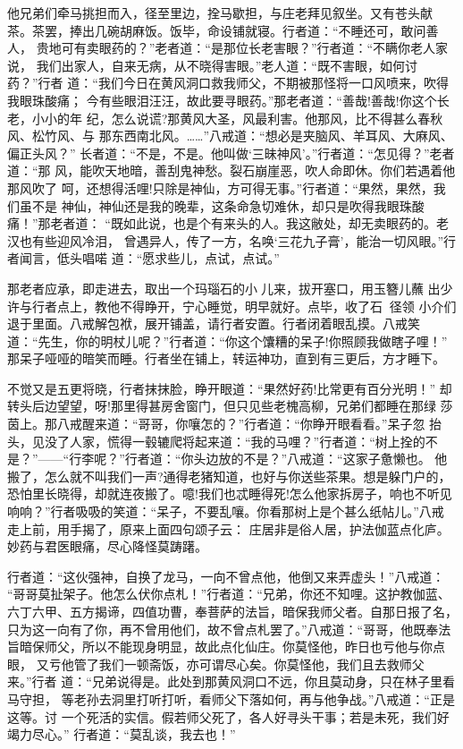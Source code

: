 他兄弟们牵马挑担而入，径至里边，拴马歇担，与庄老拜见叙坐。又有苍头献
茶。茶罢，捧出几碗胡麻饭。饭毕，命设铺就寝。行者道：“不睡还可，敢问善人，
贵地可有卖眼药的？”老者道：“是那位长老害眼？”行者道：“不瞒你老人家说，
我们出家人，自来无病，从不晓得害眼。”老人道：“既不害眼，如何讨药？”行者
道：“我们今日在黄风洞口救我师父，不期被那怪将一口风喷来，吹得我眼珠酸痛；
今有些眼泪汪汪，故此要寻眼药。”那老者道：“善哉!善哉!你这个长老，小小的年
纪，怎么说谎?那黄风大圣，风最利害。他那风，比不得甚么春秋风、松竹风、与
那东西南北风。……”八戒道：“想必是夹脑风、羊耳风、大麻风、偏正头风？”
长者道：“不是，不是。他叫做‘三昧神风’。”行者道：“怎见得？”老者道：“那
风，能吹天地暗，善刮鬼神愁。裂石崩崖恶，吹人命即休。你们若遇着他那风吹了
呵，还想得活哩!只除是神仙，方可得无事。”行者道：“果然，果然，我们虽不是
神仙，神仙还是我的晚辈，这条命急切难休，却只是吹得我眼珠酸痛！”那老者道：
“既如此说，也是个有来头的人。我这敝处，却无卖眼药的。老汉也有些迎风冷泪，
曾遇异人，传了一方，名唤‘三花九子膏’，能治一切风眼。”行者闻言，低头唱喏
道：“愿求些儿，点试，点试。”

那老者应承，即走进去，取出一个玛瑙石的小儿来，拔开塞口，用玉簪儿蘸
出少许与行者点上，教他不得睁开，宁心睡觉，明早就好。点毕，收了石，径领
小介们退于里面。八戒解包袱，展开铺盖，请行者安置。行者闭着眼乱摸。八戒笑
道：“先生，你的明杖儿呢？”行者道：“你这个馕糟的呆子!你照顾我做瞎子哩！”
那呆子哑哑的暗笑而睡。行者坐在铺上，转运神功，直到有三更后，方才睡下。

不觉又是五更将晓，行者抹抹脸，睁开眼道：“果然好药!比常更有百分光明！”
却转头后边望望，呀!那里得甚房舍窗门，但只见些老槐高柳，兄弟们都睡在那绿
莎茵上。那八戒醒来道：“哥哥，你嚷怎的？”行者道：“你睁开眼看看。”呆子忽
抬头，见没了人家，慌得一毂辘爬将起来道：“我的马哩？”行者道：“树上拴的不
是？”——“行李呢？”行者道：“你头边放的不是？”八戒道：“这家子惫懒也。
他搬了，怎么就不叫我们一声?通得老猪知道，也好与你送些茶果。想是躲门户的，
恐怕里长晓得，却就连夜搬了。噫!我们也忒睡得死!怎么他家拆房子，响也不听见
响响？”行者吸吸的笑道：“呆子，不要乱嚷。你看那树上是个甚么纸帖儿。”八戒
走上前，用手揭了，原来上面四句颂子云：
庄居非是俗人居，护法伽蓝点化庐。
妙药与君医眼痛，尽心降怪莫踌躇。

行者道：“这伙强神，自换了龙马，一向不曾点他，他倒又来弄虚头！”八戒道：
“哥哥莫扯架子。他怎么伏你点札！”行者道：“兄弟，你还不知哩。这护教伽蓝、
六丁六甲、五方揭谛，四值功曹，奉菩萨的法旨，暗保我师父者。自那日报了名，
只为这一向有了你，再不曾用他们，故不曾点札罢了。”八戒道：“哥哥，他既奉法
旨暗保师父，所以不能现身明显，故此点化仙庄。你莫怪他，昨日也亏他与你点眼，
又亏他管了我们一顿斋饭，亦可谓尽心矣。你莫怪他，我们且去救师父来。”行者
道：“兄弟说得是。此处到那黄风洞口不远，你且莫动身，只在林子里看马守担，
等老孙去洞里打听打听，看师父下落如何，再与他争战。”八戒道：“正是这等。讨
一个死活的实信。假若师父死了，各人好寻头干事；若是未死，我们好竭力尽心。”
行者道：“莫乱谈，我去也！”

